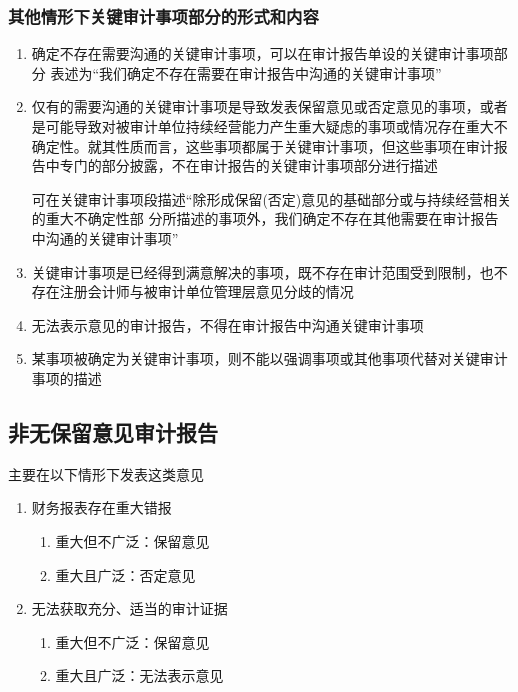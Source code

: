 \documentclass[UTF8,12pt]{ctexart}
\numberwithin{equation}{section} %
\numberwithin{figure}{section}
\numberwithin{table}{section}
\begin{document}
	\subsubsection{其他情形下关键审计事项部分的形式和内容}
	
	\begin{enumerate}
		\item 确定不存在需要沟通的关键审计事项，可以在审计报告单设的关键审计事项部分 表述为“我们确定不存在需要在审计报告中沟通的关键审计事项”
		
		\item 仅有的需要沟通的关键审计事项是导致发表保留意见或否定意见的事项，或者 是可能导致对被审计单位持续经营能力产生重大疑虑的事项或情况存在重大不 确定性。就其性质而言，这些事项都属于关键审计事项，但这些事项在审计报 告中专门的部分披露，不在审计报告的关键审计事项部分进行描述
		
		可在关键审计事项段描述“除形成保留(否定)意见的基础部分或与持续经营相关的重大不确定性部 分所描述的事项外，我们确定不存在其他需要在审计报告中沟通的关键审计事项”
		
		\item 关键审计事项是已经得到满意解决的事项，既不存在审计范围受到限制，也不 存在注册会计师与被审计单位管理层意见分歧的情况
		
		\item 无法表示意见的审计报告，不得在审计报告中沟通关键审计事项
		
		\item 某事项被确定为关键审计事项，则不能以强调事项或其他事项代替对关键审计事项的描述
	\end{enumerate}
	
	
	\subsection{非无保留意见审计报告}
	主要在以下情形下发表这类意见
	\begin{enumerate}
		\item 财务报表存在重大错报
		\begin{enumerate}
			\item 重大但不广泛：保留意见
			
			\item 重大且广泛：否定意见
		\end{enumerate}
		
		\item 无法获取充分、适当的审计证据
		\begin{enumerate}
			\item 重大但不广泛：保留意见
		
			\item 重大且广泛：无法表示意见
		\end{enumerate}
	\end{enumerate}
	
\end{document}
